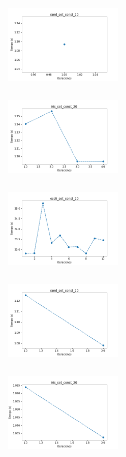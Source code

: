\begin{figure}[H]
\begin{subfigure}
    \end{subfigure}
    \hfill
    \begin{subfigure}
        \centering
        \includegraphics[width=0.32\textwidth]{img/copkm/rand_set_const_20_589741062_time.png}
    \end{subfigure}
    \hfill
    \begin{subfigure}
        \centering
        \includegraphics[width=0.32\textwidth]{img/copkm/iris_set_const_20_277451237_time.png}
    \end{subfigure}
    \hfill
    \begin{subfigure}
        \centering
        \includegraphics[width=0.32\textwidth]{img/copkm/ecoli_set_const_20_277451237_time.png}
    \end{subfigure}
    \hfill
    \begin{subfigure}
        \centering
        \includegraphics[width=0.32\textwidth]{img/copkm/rand_set_const_20_277451237_time.png}
    \end{subfigure}
    \hfill
    \begin{subfigure}
        \centering
        \includegraphics[width=0.32\textwidth]{img/copkm/iris_set_const_20_49258669_time.png}

\end{subfigure}
\end{figure}

